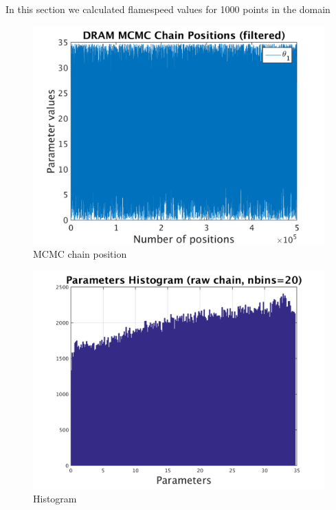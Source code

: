 In this section we calculated flamespeed values for 1000 points in the domain 

\begin{figure}[h!]
  
  \centering
   \includegraphics[scale=0.75]{output_1000/simple_ip_chain_pos_filt}
   \caption{MCMC chain position }
\end{figure}


\begin{figure}[h!]
  
  \centering
   \includegraphics[scale=0.75]{output_1000/simple_ip_hist_raw}
   \caption{Histogram}
\end{figure}



